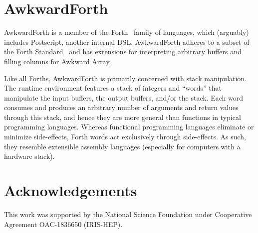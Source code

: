 \documentclass{webofc}
\begin{document}
\section{AwkwardForth}

AwkwardForth is a member of the Forth~\cite{forth} family of languages, which (arguably) includes Postscript, another internal DSL. AwkwardForth adheres to a subset of the Forth Standard~\cite{forth-standard} and has extensions for interpreting arbitrary buffers and filling columns for Awkward Array.

Like all Forths, AwkwardForth is primarily concerned with stack manipulation. The runtime environment features a stack of integers and ``words'' that manipulate the input buffers, the output buffers, and/or the stack. Each word consumes and produces an arbitrary number of arguments and return values through this stack, and hence they are more general than functions in typical programming languages. Whereas functional programming languages eliminate or minimize side-effects, Forth words act exclusively through side-effects. As such, they resemble extensible assembly languages (especially for computers with a hardware stack).







\section{Acknowledgements}

This work was supported by the National Science Foundation under Cooperative Agreement OAC-1836650 (IRIS-HEP).






\end{document}
